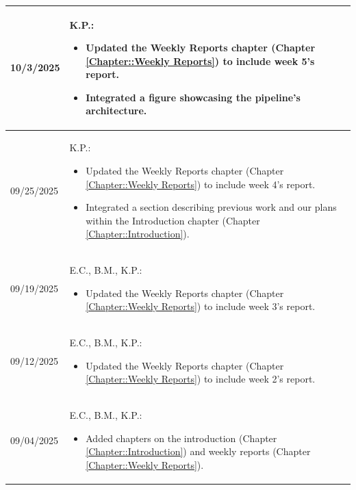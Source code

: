 \begin{longtable}{|l||p{13.5cm}|}
10/3/2025 & K.P.:
\begin{itemize}[topsep=0pt,itemsep=0pt,parsep=0pt,partopsep=0pt,leftmargin=12pt]
\item Updated the Weekly Reports chapter (Chapter \ref{Chapter::Weekly Reports}) to include week 5's report.
\item Integrated a figure showcasing the pipeline's architecture.
\end{itemize} 
\\ \hline

09/25/2025 & K.P.:
\begin{itemize}[topsep=0pt,itemsep=0pt,parsep=0pt,partopsep=0pt,leftmargin=12pt]
\item Updated the Weekly Reports chapter (Chapter \ref{Chapter::Weekly Reports}) to include week 4's report.
\item Integrated a section describing previous work and our plans within the Introduction chapter (Chapter \ref{Chapter::Introduction}).
\end{itemize} 
\\ \hline

09/19/2025 & E.C., B.M., K.P.:
\begin{itemize}[topsep=0pt,itemsep=0pt,parsep=0pt,partopsep=0pt,leftmargin=12pt]
\item Updated the Weekly Reports chapter (Chapter \ref{Chapter::Weekly Reports}) to include week 3's report.
\end{itemize} 
\\ \hline

09/12/2025 & E.C., B.M., K.P.:
\begin{itemize}[topsep=0pt,itemsep=0pt,parsep=0pt,partopsep=0pt,leftmargin=12pt]
\item Updated the Weekly Reports chapter (Chapter \ref{Chapter::Weekly Reports}) to include week 2's report.
\end{itemize} 
\\ \hline

09/04/2025 & E.C., B.M., K.P.:
\begin{itemize}[topsep=0pt,itemsep=0pt,parsep=0pt,partopsep=0pt,leftmargin=12pt]
\item Added chapters on the introduction (Chapter \ref{Chapter::Introduction}) 
and weekly reports (Chapter \ref{Chapter::Weekly Reports}).
\end{itemize} 
\\ \hline

\end{longtable}


